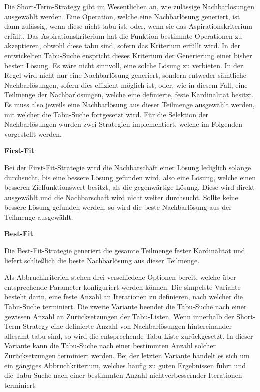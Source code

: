 Die Short-Term-Strategy gibt im Wesentlichen an, wie zulässige Nachbarlösungen ausgewählt werden.
Eine Operation, welche eine Nachbarlösung generiert, ist dann zulässig, wenn diese nicht tabu ist,
oder, wenn sie das Aspirationskriterium erfüllt. Das Aspirationskriterium hat die Funktion bestimmte
Operationen zu akzeptieren, obwohl diese tabu sind, sofern das Kriterium erfüllt wird.
In der entwickelten Tabu-Suche enspricht dieses Kriterium der Generierung einer bisher besten Lösung.
Es wäre nicht sinnvoll, eine solche Lösung zu verbieten.\newline
In der Regel wird nicht nur eine Nachbarlösung generiert, sondern entweder sämtliche Nachbarlösungen,
sofern dies effizient möglich ist, oder, wie in diesem Fall, eine Teilmenge der Nachbarlösungen,
welche eine definierte, feste Kardinalität besitzt. Es muss also jeweils eine Nachbarlösung aus dieser
Teilmenge ausgewählt werden, mit welcher die Tabu-Suche fortgesetzt wird.
Für die Selektion der Nachbarlösungen wurden zwei Strategien implementiert, welche im Folgenden vorgestellt
werden.

\textbf{First-Fit}

Bei der First-Fit-Strategie wird die Nachbarschaft einer Lösung lediglich solange durchsucht, bis eine bessere
Lösung gefunden wird, also eine Lösung, welche einen besseren Zielfunktionswert besitzt, als die gegenwärtige Lösung.
Diese wird direkt ausgewählt und die Nachbarschaft wird nicht weiter durchsucht. Sollte keine bessere Lösung gefunden werden,
so wird die beste Nachbarlösung aus der Teilmenge ausgewählt.

\textbf{Best-Fit}

Die Best-Fit-Strategie generiert die gesamte Teilmenge fester Kardinalität und liefert schließlich die
beste Nachbarlösung aus dieser Teilmenge.\newline

Als Abbruchkriterien stehen drei verschiedene Optionen bereit, welche über entsprechende Parameter konfiguriert werden können.
Die simpelste Variante besteht darin, eine feste Anzahl an Iterationen zu definieren, nach welcher die Tabu-Suche terminiert.
Die zweite Variante beendet die Tabu-Suche nach einer gewissen Anzahl an Zurücksetzungen der Tabu-Listen. Wenn innerhalb
der Short-Term-Strategy eine definierte Anzahl von Nachbarlösungen hintereinander allesamt tabu sind, so wird die
entsprechende Tabu-Liste zurückgesetzt. In dieser Variante kann die Tabu-Suche nach einer bestimmten Anzahl solcher Zurücksetzungen terminiert werden. Bei der letzten Variante handelt es sich um ein gängiges Abbruchkriterium, welches häufig zu guten Ergebnissen führt und die Tabu-Suche nach einer bestimmten Anzahl nichtverbessernder Iterationen terminiert.


